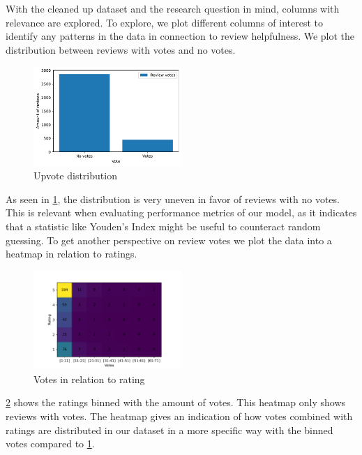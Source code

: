 \documentclass[twoside,twocolumn]{article}
\begin{document}
With the cleaned up dataset and the research question in mind, columns with relevance are explored. To explore, we plot different columns of interest to identify any patterns in the data in connection to review helpfulness. We plot the distribution between reviews with votes and no votes.
\begin{figure}[h]
	\centering
	\includegraphics[width=0.5\textwidth]{img/no_votes_vs_votes.pdf}
	\caption{Upvote distribution}
	\label{fig:votes_distribution}
\end{figure}
As seen in \figurename{\ref{fig:votes_distribution}}, the distribution is very uneven in favor of reviews with no votes. This is relevant when evaluating performance metrics of our model, as it indicates that a statistic like Youden's Index might be useful to counteract random guessing. To get another perspective on review votes we plot the data into a heatmap in relation to ratings.
\begin{figure}[h]
	\centering
	\includegraphics[width=0.5\textwidth]{img/rating_vote_heatmap_excluding_no_votes.pdf}
	\caption{Votes in relation to rating}
	\label{fig:rating_vote_heatmap}
\end{figure}
\figurename{\ref{fig:rating_vote_heatmap}} shows the ratings binned with the amount of votes. This heatmap only shows reviews with votes. The heatmap gives an indication of how votes combined with ratings are distributed in our dataset in a more specific way with the binned votes compared to \figurename{\ref{fig:votes_distribution}}.


\end{document}
